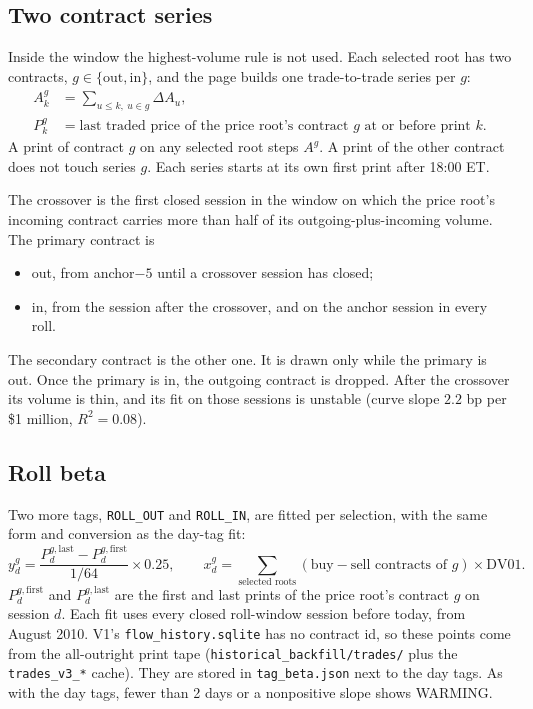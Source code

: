 \documentclass[11pt]{article}
\begin{document}
\subsection{Two contract series}

Inside the window the highest-volume rule is not used. Each selected root has two contracts, $g\in\{\mathrm{out},\mathrm{in}\}$, and the page builds one trade-to-trade series per $g$:
\begin{align}
A_k^{g} &= \sum_{u\le k,\ u\in g}\Delta A_u, \\
P_k^{g} &= \text{last traded price of the price root's contract } g \text{ at or before print } k.
\end{align}
A print of contract $g$ on any selected root steps $A^{g}$. A print of the other contract does not touch series $g$. Each series starts at its own first print after 18:00 ET.

The crossover is the first closed session in the window on which the price root's incoming contract carries more than half of its outgoing-plus-incoming volume. The primary contract is
\begin{itemize}
    \item out, from anchor$-5$ until a crossover session has closed;
    \item in, from the session after the crossover, and on the anchor session in every roll.
\end{itemize}
The secondary contract is the other one. It is drawn only while the primary is out. Once the primary is in, the outgoing contract is dropped. After the crossover its volume is thin, and its fit on those sessions is unstable (curve slope $2.2$ bp per \$1 million, $R^2=0.08$).

\subsection{Roll beta}

Two more tags, \texttt{ROLL\_OUT} and \texttt{ROLL\_IN}, are fitted per selection, with the same form and conversion as the day-tag fit:
\[
y_d^{g}=\frac{P^{g,\text{last}}_d-P^{g,\text{first}}_d}{1/64}\times 0.25,\qquad
x_d^{g}=\sum_{\text{selected roots}}(\text{buy}-\text{sell contracts of }g)\times\mathrm{DV01}.
\]
$P^{g,\text{first}}_d$ and $P^{g,\text{last}}_d$ are the first and last prints of the price root's contract $g$ on session $d$. Each fit uses every closed roll-window session before today, from August 2010. V1's \texttt{flow\_history.sqlite} has no contract id, so these points come from the all-outright print tape (\texttt{historical\_backfill/trades/} plus the \texttt{trades\_v3\_*} cache). They are stored in \texttt{tag\_beta.json} next to the day tags. As with the day tags, fewer than 2 days or a nonpositive slope shows WARMING.
\end{document}
